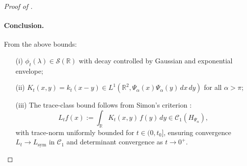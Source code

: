 \begin{proof}[Proof of ]
\paragraph{Conclusion.}
From the above bounds:
\begin{itemize}
    \item[\textup{(i)}] \( \phi_t(\lambda) \in \mathcal{S}(\mathbb{R}) \) with decay controlled by Gaussian and exponential envelope;
    \item[\textup{(ii)}] \( K_t(x,y) = k_t(x - y) \in L^1(\mathbb{R}^2, \Psi_\alpha(x)\Psi_\alpha(y)\, dx\,dy) \) for all \( \alpha > \pi \);
    \item[\textup{(iii)}] The trace-class bound follows from Simon's criterion \cite[Thm.~4.2]{Simon2005TraceIdeals}:
    \[
    L_t f(x) := \int_{\mathbb{R}} K_t(x,y)\, f(y)\, dy \in \mathcal{C}_1(H_{\Psi_\alpha}),
    \]
    with trace-norm uniformly bounded for \( t \in (0, t_0] \), ensuring convergence \( L_t \to L_{\mathrm{sym}} \) in \( \mathcal{C}_1 \) and determinant convergence as \( t \to 0^+ \).
\end{itemize}
\end{proof}
